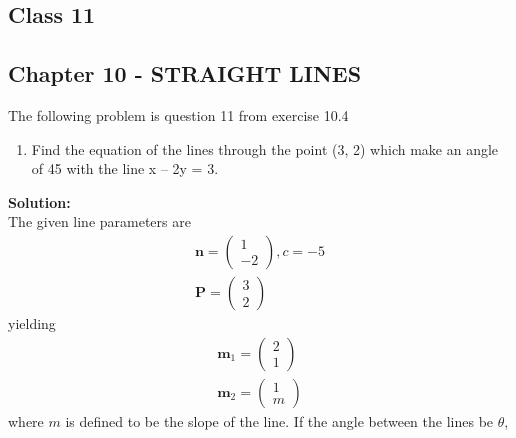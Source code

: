 \documentclass[10pt,a4paper]{report}
\newcommand{\myvec}[1]{\ensuremath{\begin{pmatrix}#1\end{pmatrix}}}
\let\vec\mathbf
\let\vec\mathbf
\renewcommand{\vec}[1]{\textbf{#1}}
\begin{document}
\onehalfspacing
\begin{center}
	\section*{\textbf{Class 11}}
	\subsection*{Chapter 10 - STRAIGHT LINES}
\end{center}
The following problem is question 11 from exercise 10.4
\begin{enumerate}
    \item Find the equation of the lines through the point (3, 2) which make an angle of 45\textdegree \hspace{0.1cm} with the line x – 2y = 3.
\end{enumerate}
\textbf{Solution:}\\
The given line parameters are
\begin{align}
   \vec{n}=\myvec{1\\-2},c=-5\\
	\vec{P}=\myvec{3\\2}
\end{align}
yielding
\begin{align}
\vec{m}_1=\myvec{2\\1}\\
\vec{m}_2=\myvec{1\\m}
\end{align}
where  $m$ is defined to be the slope of the line. If the angle between the lines be $\theta$,
\end{document}
